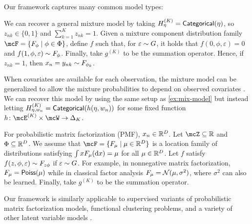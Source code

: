 Our framework captures many common model types: 

\begin{example}\label{ex:mix-model}
	We can recover a general mixture model by taking $H_\eta^{(K)} = {\sf{Categorical}}(\eta)$, 
	so $z_{nk} \in \{0,1\}$ and $\sum_{k=1}^K z_{nk} = 1$.
	Given a mixture component distribution family $\mcF = \{ F_{\phi} \mid \phi \in \Phi \}$,
	define $f$ such that, for  $\varepsilon \sim G$, it holds that
    $f(0, \phi, \varepsilon) = 0$ and $f(1, \phi, \varepsilon) \sim F_\phi$. 
	Finally, take $g^{(K)}$ to be the summation operator.
	Hence, if $z_{nk} = 1$, then $x_n = y_{nk} \sim F_{\phi_k}$.
\end{example}
\begin{example} \label{ex:mix-model-varying}
	When covariates are available for each observation, the mixture model can be generalized to
	allow the mixture probabilities to depend on observed covariates \citep{Jaspers_BayesianEstimationMixtureCovariate_2018,Huang_MixtureRegressionModels_2012}.
	We can recover this model by using the same setup as \cref{ex:mix-model}
	but instead letting $H_{\eta,w_n}^{(K)} = {\sf{Categorical}}(h(\eta, w_{n}))$ for some fixed function
	$h \colon \mcE^{(K)} \times \mcW \to \Delta_{\numcomps}$.
\end{example}
\begin{example}\label{ex:pmf-formulations}
	For probabilistic matrix factorization (PMF), $x_n \in \mathbb{R}^{D}$.
	Let $\mcZ \subseteq \reals$ and $\Phi \subseteq \mathbb{R}^{D}$.
	We assume that $\mcF = \{ F_{\mu} \mid \mu \in \reals^{D} \}$ is a location family of distributions satisfying $\int x F_\mu(\mathrm{d} x) = \mu$ for all $\mu \in \mathbb{R}^{D}$.
	Let $f$ satisfy $f(z, \phi, \varepsilon) \sim F_{z \phi}$ if  $\varepsilon \sim G$.
	For example, in nonnegative matrix factorization, $F_{\mu} = {\sf{Poiss}}(\mu)$ while in classical factor analysis $F_{\mu} = \mathcal{N}(\mu, \sigma^{2})$,
	where $\sigma^{2}$ can also be learned.
	Finally, take $g^{(K)}$ to be the summation operator.
\end{example}
Our framework is similarly applicable to supervised variants of probabilistic matrix factorization models, functional clustering problems, and a variety
of other latent variable models \citep{Carvalho:2008,Chiou:2007,Cunningham:2014,West:2003,Blei:2007,Dunson:2000}.


